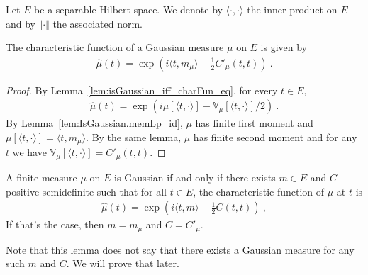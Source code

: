 Let $E$ be a separable Hilbert space. We denote by $\langle \cdot, \cdot \rangle$ the inner product on $E$ and by $\Vert \cdot \Vert$ the associated norm.

\begin{lemma}\label{lem:IsGaussian.charFun_eq}
  \mathlibok
The characteristic function of a Gaussian measure $\mu$ on $E$ is given by
\begin{align*}
  \hat{\mu}(t) = \exp\left(i \langle t, m_\mu \rangle - \frac{1}{2} C'_\mu(t, t)\right) \: .
\end{align*}
\end{lemma}

\begin{proof}\mathlibok
By Lemma~\ref{lem:isGaussian_iff_charFun_eq}, for every $t \in E$,
\begin{align*}
  \hat{\mu}(t) = \exp\left(i \mu[\langle t, \cdot \rangle] - \mathbb{V}_\mu[\langle t, \cdot \rangle] / 2\right) \: .
\end{align*}
By Lemma~\ref{lem:IsGaussian.memLp_id}, $\mu$ has finite first moment and $\mu[\langle t, \cdot \rangle] = \langle t, m_\mu \rangle$. By the same lemma, $\mu$ has finite second moment and for any $t$ we have $\mathbb{V}_\mu[\langle t, \cdot\rangle] = C'_\mu(t, t)$.
\end{proof}

\begin{lemma}\label{lem:isGaussian_iff_gaussian_charFun}
  \mathlibok
A finite measure $\mu$ on $E$ is Gaussian if and only if there exists $m \in E$ and $C$ positive semidefinite such that for all $t \in E$, the characteristic function of $\mu$ at $t$ is
\begin{align*}
  \hat{\mu}(t) = \exp\left(i \langle t, m \rangle - \frac{1}{2} C(t, t)\right) \: ,
\end{align*}
If that's the case, then $m = m_\mu$ and $C = C'_\mu$.
\end{lemma}

Note that this lemma does not say that there exists a Gaussian measure for any such $m$ and $C$.
We will prove that later.

